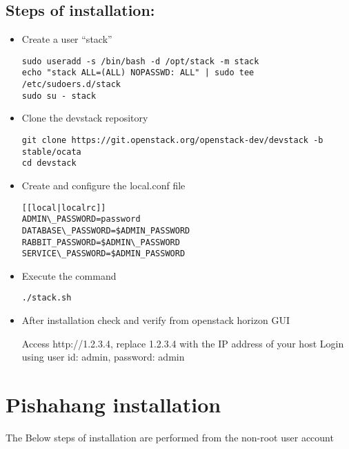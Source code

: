 	\subsection*{Steps of installation:}
	\begin{itemize}
		\item Create a user “stack”
		\begin{lstlisting}
sudo useradd -s /bin/bash -d /opt/stack -m stack
echo "stack ALL=(ALL) NOPASSWD: ALL" | sudo tee /etc/sudoers.d/stack
sudo su - stack
		\end{lstlisting}
		
		\item Clone the devstack repository
		\begin{lstlisting}
git clone https://git.openstack.org/openstack-dev/devstack -b stable/ocata
cd devstack
		\end{lstlisting}
		\newpage
		\item Create and configure the local.conf file\\
		\begin{lstlisting}
[[local|localrc]]
ADMIN\_PASSWORD=password
DATABASE\_PASSWORD=$ADMIN_PASSWORD
RABBIT_PASSWORD=$ADMIN\_PASSWORD
SERVICE\_PASSWORD=$ADMIN_PASSWORD 	
		\end{lstlisting}
		
		
		\item Execute the command
		\begin{lstlisting}
./stack.sh
		\end{lstlisting}
		
		\item After installation check and verify from openstack horizon GUI
		
		Access http://1.2.3.4, replace 1.2.3.4 with the IP address of your host
		Login using user id: admin, password: admin
	\end{itemize}
	
	\section{Pishahang installation}
	\label{sec:Pishahang installation}
	The Below steps of installation are performed from the non-root user account
	

